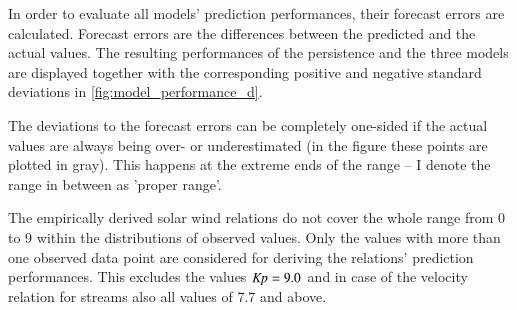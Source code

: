In order to evaluate all models' prediction performances, their forecast errors are calculated. Forecast errors are the differences between the predicted and the actual values. The resulting performances of the persistence and the three models are displayed together with the corresponding positive and negative standard deviations in \autoref{fig:model_performance_d}.
\begin{figure}
\end{figure}
The deviations to the forecast errors can be completely one-sided if the actual \Kp{} values are always being over- or underestimated (in the figure these points are plotted in gray). This happens at the extreme ends of the \Kp{} range -- I denote the range in between as 'proper range'.

The empirically derived solar wind relations do not cover the whole \Kp{} range from 0 to 9 within the distributions of observed values. Only the \Kp{} values with more than one observed data point are considered for deriving the relations' prediction performances. This excludes the values $\text{\textit{Kp}} = 9.0$ and in case of the velocity relation for streams also all values of \num{7.7} and above.

